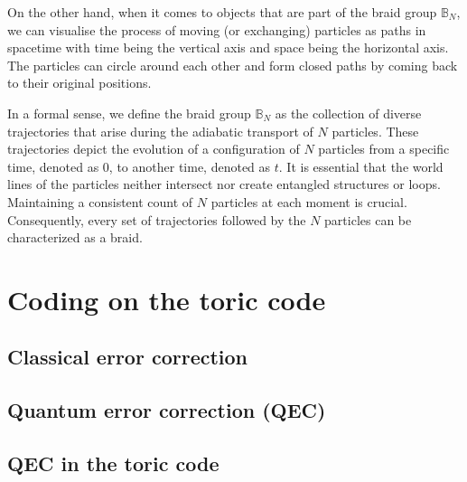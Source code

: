 \documentclass{Configuration_Files/PoliMi3i_thesis}
\begin{document}
On the other hand, when it comes to objects that are part of the braid group $\mathbb{B}_N$, we can visualise the process of moving (or exchanging) particles as paths in spacetime with time being the vertical axis and space being the horizontal axis. The particles can circle around each other and form closed paths by coming back to their original positions. \newline

In a formal sense, we define the braid group $\mathbb{B}_N$ as the collection of diverse trajectories that arise during the adiabatic transport of $N$ particles. These trajectories depict the evolution of a configuration of $N$ particles from a specific time, denoted as 0, to another time, denoted as $t$. It is essential that the world lines of the particles neither intersect nor create entangled structures or loops. Maintaining a consistent count of $N$ particles at each moment is crucial. Consequently, every set of trajectories followed by the $N$ particles can be characterized as a braid. \newline













\chapter{Coding on the toric code}
\label{ch:chapter_two}

\section{Classical error correction}
\label{sec:CER}



\section{Quantum error correction (QEC)}
\label{sec:QEC}



\section{QEC in the toric code}
\label{sec:TC}
\end{document}
